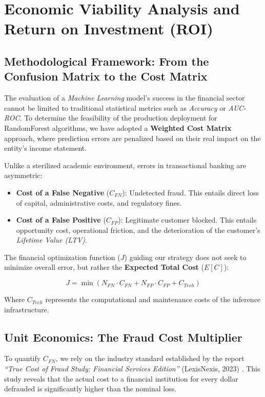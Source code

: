 \documentclass[12pt,a4paper]{report}
\begin{document}
\chapter{Economic Viability Analysis and Return on Investment (ROI)}

\section{Methodological Framework: From the Confusion Matrix to the Cost Matrix}

The evaluation of a \textit{Machine Learning} model's success in the financial sector cannot be limited to traditional statistical metrics such as \textit{Accuracy} or \textit{AUC-ROC}. To determine the feasibility of the production deployment for RandomForest algorithms, we have adopted a \textbf{Weighted Cost Matrix} approach, where prediction errors are penalized based on their real impact on the entity's income statement.

Unlike a sterilized academic environment, errors in transactional banking are asymmetric:

\begin{itemize}
    \item \textbf{Cost of a False Negative} (\(C_{FN}\)): Undetected fraud. This entails direct loss of capital, administrative costs, and regulatory fines.
    \item \textbf{Cost of a False Positive} (\(C_{FP}\)): Legitimate customer blocked. This entails opportunity cost, operational friction, and the deterioration of the customer's \textit{Lifetime Value (LTV)}.
\end{itemize}

The financial optimization function (\(J\)) guiding our strategy does not seek to minimize overall error, but rather the \textbf{Expected Total Cost} (\(E[C]\)):

\[
J = \min \left( N_{FN} \cdot C_{FN} + N_{FP} \cdot C_{FP} + C_{Tech} \right)
\]

Where \(C_{Tech}\) represents the computational and maintenance costs of the inference infrastructure.



\section{Unit Economics: The Fraud Cost Multiplier}

To quantify \(C_{FN}\), we rely on the industry standard established by the report \textit{\textquotedblleft True Cost of Fraud Study: Financial Services Edition\textquotedblright} (LexisNexis, 2023) \cite{lexisnexis2023a}. This study reveals that the actual cost to a financial institution for every dollar defrauded is significantly higher than the nominal loss.
\end{document}
